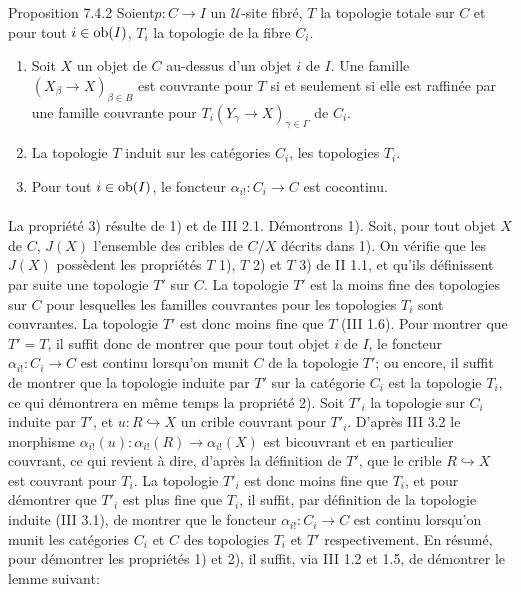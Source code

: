 \documentclass[10pt]{../fichiers-configuration-latex/smfart}
\begin{document}
\begin{enonce*}{Proposition 7.4.2}
Soient\pageoriginale $p : C \to I$ un $𝒰$-site fibré, $T$ la
topologie totale sur $C$ et pour tout $i \in \operatorname{ob}(I)$, $T_i$ la topologie de la fibre $C_i$.
\begin{enumerate}
\renewcommand{\labelenumi}{\theenumi)}
\item Soit $X$ un objet de $C$ au-dessus d'un objet $i$ de $I$. Une
  famille $(X_\beta \to X)_{\beta \in B}$ est couvrante pour $T$ si et
  seulement si elle est raffinée par une famille couvrante pour $T_i
  (Y_{\gamma} \to X)_{\gamma \in \Gamma}$ de $C_i$.

\item La topologie $T$ induit sur les catégories $C_i$, les
  topologies $T_i$.

\item Pour tout $i \in \operatorname{ob} (I)$, le foncteur $\alpha_{i!} : C_i \to C$
  est cocontinu.
\end{enumerate}
\end{enonce*}

\setcounter{subsubsection}{2}
\setcounter{paragraph}{0}
\paragraph{}

La propriété 3) résulte de 1) et de III 2.1. Démontrons 1). Soit, pour
tout objet $X$ de $C$, $J(X)$ l'ensemble des cribles de $C/X$ décrits
dans 1). On vérifie que les $J(X)$ possèdent les propriétés $T$ 1),
$T$ 2) et $T$ 3) de II 1.1, et qu'ils définissent par suite une
topologie $T'$ sur $C$. La topologie $T'$ est la moins fine des
topologies sur $C$ pour lesquelles les familles couvrantes pour les
topologies $T_i$ sont couvrantes. La topologie $T'$ est donc moins
fine que $T$ (III 1.6). Pour montrer que $T'= T$, il suffit donc de
montrer que pour tout objet $i$ de $I$, le foncteur $\alpha_{i!} : C_i
\to C$ est continu lorsqu'on munit $C$ de la topologie $T'$; ou
encore, il suffit de montrer que la topologie induite par $T'$ sur la
catégorie $C_i$ est la topologie $T_i$, ce qui démontrera en même
temps la propriété 2). Soit $T'_i$ la topologie sur $C_i$ induite
par $T'$, et $u : R \hookrightarrow X$ un crible couvrant pour
$T'_i$. D'après III 3.2 le morphisme $\alpha_{i!} (u) : \alpha_{i!}
(R)\to \alpha_{i!} (X)$ est bicouvrant et en particulier couvrant, ce qui
revient à dire, d'après la définition de $T'$, que le crible $R
\hookrightarrow X$ est couvrant pour $T_i$. La topologie $T'_i$ est
donc moins fine que $T_i$, et pour démontrer que $T'_i$ est plus
fine que $T_i$, il suffit, par définition de la topologie induite (III
3.1), de montrer que le foncteur $\alpha_{i!} : C_i \to C$ est continu
lorsqu'on munit les catégories $C_i$ et $C$ des topologies $T_i$ et
$T'$ respectivement. En résumé, pour démontrer les propriétés 1) et
2), il suffit, via III 1.2 et  1.5, de démontrer le lemme suivant:
\end{document}
